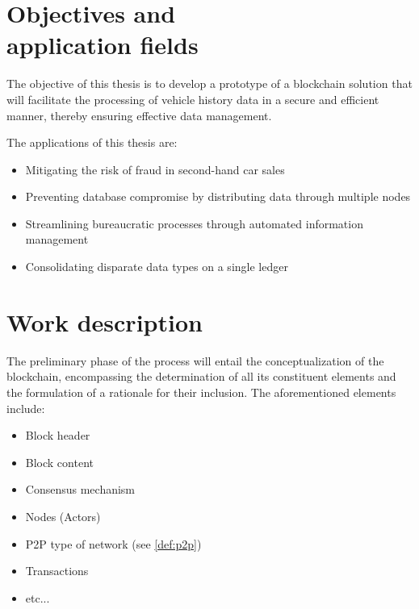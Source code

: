 \documentclass[twocolumn]{article}
\begin{document}
\newpage
\section{Objectives and \\ application fields}
The objective of this thesis is to develop a prototype of a blockchain solution that will facilitate the processing of vehicle history data in a secure and efficient manner, thereby ensuring effective data management.

\noindent The applications of this thesis are:
\begin{itemize}
    \item Mitigating the risk of fraud in second-hand car sales
    \item Preventing database compromise by distributing data through multiple nodes
    \item Streamlining bureaucratic processes through automated information management
    \item Consolidating disparate data types on a single ledger 
\end{itemize}


\section{Work description}
The preliminary phase of the process will entail the conceptualization of the blockchain, encompassing the determination of all its constituent elements and the formulation of a rationale for their inclusion. The aforementioned elements include:
\begin{itemize}
    \item Block header
    \item Block content
    \item Consensus mechanism
    \item Nodes (Actors)
    \item P2P type of network (see \cref{def:p2p})
    \item Transactions
    \item etc... \cite{patel2020review}
\end{itemize}
\end{document}
